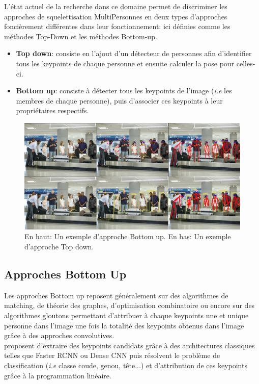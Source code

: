 L'état actuel de la recherche dans ce domaine permet de discriminer les approches de squelettisation MultiPersonnes en deux types d'approches foncièrement différentes dans leur fonctionnement: ici définies comme les méthodes Top-Down et les méthodes Bottom-up.
\begin{itemize}
    \item \textbf{Top down}: consiste en l'ajout d'un détecteur de personnes afin d'identifier tous les keypoints de chaque personne et ensuite calculer la pose pour celles-ci.
    \item \textbf{Bottom up}: consiste à détecter tous les keypoints de l'image (\textit{i.e} les membres de chaque personne), puis d'associer ces keypoints à leur propriétaires respectifs.
\end{itemize}

\begin{figure}[H]
    \centering
    \includegraphics[width=1\linewidth]{Images/topvsbottom2.png}
    \caption{En haut: Un exemple d'approche Bottom up. En bas: Un exemple d'approche Top down.}
    \label{fig:topvsbottom}
\end{figure}

\label{subsec:SQUEL}
\subsection{Approches Bottom Up}
Les approches Bottom up reposent généralement sur des algorithmes de matching, de théorie des graphes, d'optimisation combinatoire ou encore sur des algorithmes gloutons permettant d'attribuer à chaque keypoints une et unique personne dans l'image une fois la totalité des keypoints obtenus dans l'image grâce à des approches convolutives.\\

\cite{2015arXiv151106645P} proposent d'extraire des keypoints candidats grâce à des architectures classiques telles que Faster RCNN ou Dense CNN puis résolvent le problème de classification (\textit{i.e} classe coude, genou, tête...) et d'attribution de ces keypoints grâce à la programmation linéaire. 

